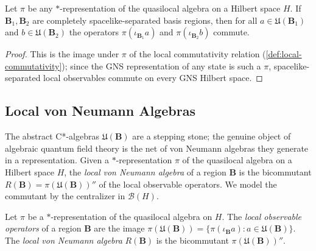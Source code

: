 \begin{theorem}
    \label{thrm:einstein-causality}
    \leanok
    Let $\pi$ be any $*$-representation of the quasilocal algebra on a Hilbert space $H$. If $\mathbf{B}_1, \mathbf{B}_2$ are completely spacelike-separated basis regions, then for all $a \in \mathfrak{U}(\mathbf{B}_1)$ and $b \in \mathfrak{U}(\mathbf{B}_2)$ the operators $\pi(\iota_{\mathbf{B}_1} a)$ and $\pi(\iota_{\mathbf{B}_2} b)$ commute.
\end{theorem}
\begin{proof}
    \leanok
    This is the image under $\pi$ of the local commutativity relation (\ref{def:local-commutativity}); since the GNS representation of any state is such a $\pi$, spacelike-separated local observables commute on every GNS Hilbert space.
\end{proof}

\subsection{Local von Neumann Algebras}

The abstract C*-algebras $\mathfrak{U}(\mathbf{B})$ are a stepping stone; the genuine object of algebraic quantum field theory is the net of von Neumann algebras they generate in a representation. Given a $*$-representation $\pi$ of the quasilocal algebra on a Hilbert space $H$, the \emph{local von Neumann algebra} of a region $\mathbf{B}$ is the bicommutant $R(\mathbf{B}) = \pi(\mathfrak{U}(\mathbf{B}))''$ of the local observable operators. We model the commutant by the centralizer in $\mathcal{B}(H)$.

\begin{definition}
    \label{def:local-von-neumann}
    \leanok
    Let $\pi$ be a $*$-representation of the quasilocal algebra on $H$. The \emph{local observable operators} of a region $\mathbf{B}$ are the image $\pi(\mathfrak{U}(\mathbf{B})) = \{\pi(\iota_{\mathbf{B}} a) : a \in \mathfrak{U}(\mathbf{B})\}$. The \emph{local von Neumann algebra} $R(\mathbf{B})$ is the bicommutant $\pi(\mathfrak{U}(\mathbf{B}))''$.
\end{definition}

